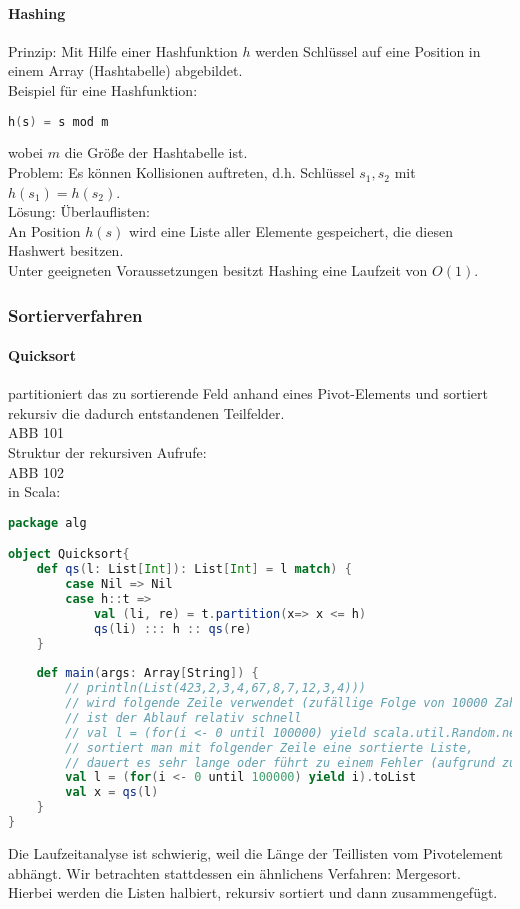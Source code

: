 \paragraph{Hashing}
Prinzip: Mit Hilfe einer Hashfunktion $h$ werden Schlüssel auf eine Position in einem Array (Hashtabelle) abgebildet.\\
Beispiel für eine Hashfunktion:
\begin{lstlisting}[language=C]
h(s) = s mod m
\end{lstlisting}
wobei $m$ die Größe der Hashtabelle ist.\\
Problem: Es können Kollisionen auftreten, d.h. Schlüssel $s_1,s_2$ mit $h(s_1)=h(s_2)$. \\
Lösung: Überlauflisten:\\
An Position $h(s)$ wird eine Liste aller Elemente gespeichert, die diesen Hashwert besitzen.\\
Unter geeigneten Voraussetzungen besitzt Hashing eine Laufzeit von $O(1)$.

\subsubsection{Sortierverfahren}

\paragraph{Quicksort} 
partitioniert das zu sortierende Feld anhand eines Pivot-Elements und sortiert rekursiv die dadurch entstandenen Teilfelder.\\
ABB 101\\
Struktur der rekursiven Aufrufe:\\
ABB 102\\
in Scala:
\begin{lstlisting}[language=scala]
package alg

object Quicksort{
	def qs(l: List[Int]): List[Int] = l match) {
		case Nil => Nil
		case h::t =>
			val (li, re) = t.partition(x=> x <= h)
			qs(li) ::: h :: qs(re)
	}
	
	def main(args: Array[String]) {
		// println(List(423,2,3,4,67,8,7,12,3,4)))
		// wird folgende Zeile verwendet (zufällige Folge von 10000 Zahlen), 
		// ist der Ablauf relativ schnell
		// val l = (for(i <- 0 until 100000) yield scala.util.Random.nextInt).toList
		// sortiert man mit folgender Zeile eine sortierte Liste, 
		// dauert es sehr lange oder führt zu einem Fehler (aufgrund zu vieler Rekursionen)
		val l = (for(i <- 0 until 100000) yield i).toList
		val x = qs(l)
	}
}
\end{lstlisting}
Die Laufzeitanalyse ist schwierig, weil die Länge der Teillisten vom Pivotelement abhängt. Wir betrachten stattdessen ein ähnlichens Verfahren: Mergesort.\\
Hierbei werden die Listen halbiert, rekursiv sortiert und dann zusammengefügt.

